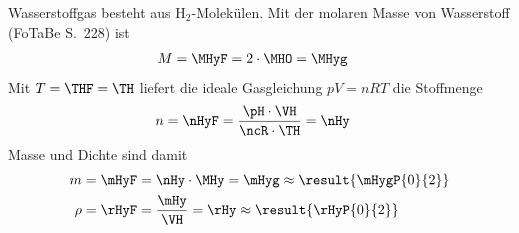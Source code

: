 Wasserstoffgas besteht aus $\mathrm{H_2}$-Molekülen. Mit der molaren Masse von Wasserstoff (FoTaBe S.~228) ist
\begin{align}
 M &= \MHyF = 2\cdot\MHO = \MHyg
\end{align}
Mit $T = \THF = \TH$ liefert die ideale Gasgleichung $pV = nRT$ die Stoffmenge
\begin{align}
 n &= \nHyF = \frac{\pH\cdot\VH}{\ncR\cdot\TH} = \nHy
\end{align}
Masse und Dichte sind damit
\begin{align}
 m &= \mHyF = \nHy\cdot\MHy = \mHyg \approx \result{\mHygP{0}{2}} \\
 \rho &= \rHyF = \frac{\mHy}{\VH} = \rHy \approx \result{\rHyP{0}{2}}
\end{align}
